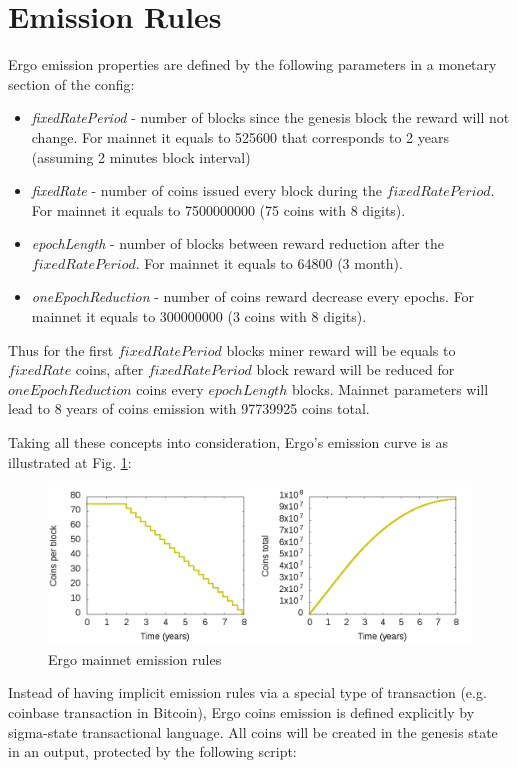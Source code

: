 \section{Emission Rules}
Ergo emission properties are defined by the following parameters in a monetary section of the config:

\begin{itemize}
    \item{\em fixedRatePeriod } - number of blocks since the genesis block the reward will not change.
    For mainnet it equals to 525600 that corresponds to 2 years (assuming 2 minutes block interval)
    \item{\em fixedRate } - number of coins issued every block during the $fixedRatePeriod$.
    For mainnet it equals to 7500000000 (75 coins with 8 digits).
    \item{\em epochLength } - number of blocks between reward reduction after the $fixedRatePeriod$.
    For mainnet it equals to 64800 (3 month).
    \item{\em oneEpochReduction } - number of coins reward decrease every epochs.
    For mainnet it equals to 300000000 (3 coins with 8 digits).
\end{itemize}

Thus for the first $fixedRatePeriod$ blocks miner reward will be equals to $fixedRate$ \ergo{} coins,
after $fixedRatePeriod$ block reward will be reduced for $oneEpochReduction$ coins every $epochLength$ blocks.
Mainnet parameters will lead to 8 years of coins emission with 97739925 coins total.

Taking all these concepts into consideration, Ergo's emission curve is as illustrated at Fig. \ref{fig:emission}:

\begin{figure}[H]
    \centering
    \includegraphics[width=\textwidth]{img/curve_combined.png}
    \caption{Ergo mainnet emission rules
    \label{fig:emission}}
\end{figure}


Instead of having implicit emission rules via a special type of transaction (e.g. coinbase transaction in Bitcoin),
Ergo coins emission is defined explicitly by sigma-state transactional language.
All \ergo{} coins will be created in the genesis state in an output, protected by the following script:

